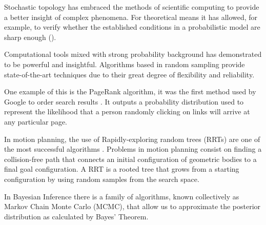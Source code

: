 Stochastic topology has embraced the methods of scientific computing to provide a better insight of complex phenomena. For theoretical means it has allowed, for example, to verify whether the established conditions in a probabilistic model are sharp enough (\cite[Aronshtam 13]{Meshulam13}).

Computational tools mixed with strong probability background has demonstrated to be powerful and insightful. Algorithms based in random sampling provide state-of-the-art techniques due to their great degree of flexibility and reliability.

One example of this is the PageRank algorithm, it was the first method used by Google to order search results \cite[Page 99]{pageRank}. It outputs a probability distribution used to represent the likelihood that a person randomly clicking on links will arrive at any particular page.

In motion planning, the use of Rapidly-exploring random trees (RRTs) are one of the most successful algorithms \cite[Alcazar 15]{Alcazar15}. Problems in motion planning consist on finding a collision-free path that connects an initial configuration of geometric bodies to a final goal configuration. A RRT is a rooted tree that grows from a starting configuration by using random samples from the search space. 

In Bayesian Inference there is a family of algorithms, known collectively as Markov Chain Monte Carlo (MCMC), that allow us to approximate the posterior distribution as calculated by Bayes' Theorem.